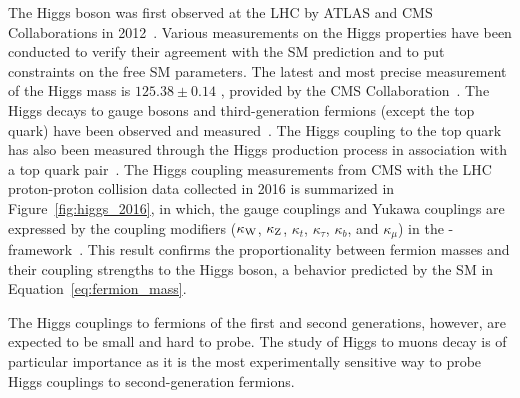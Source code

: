 The Higgs boson was first observed at the LHC by ATLAS and CMS Collaborations in 2012~\cite{Aad:2012tfa, Chatrchyan:2012xdj, Chatrchyan:2013lba}.
Various measurements on the Higgs properties have been conducted to verify their agreement with the SM prediction and to put constraints on the free SM parameters.
The latest and most precise measurement of the Higgs mass is $125.38 \pm 0.14$ \GeV, provided by the CMS Collaboration~\cite{2020135425}. 
The Higgs decays to gauge bosons and third-generation fermions (except the top quark) have been observed 
and measured~\cite{Sirunyan:2312121, 201996, Sirunyan:2017exp, PhysRevLett.121.121801, 2018283, PhysRevD.99.072001, 201859, 2019508, Aaboud_2018}.
The Higgs coupling to the top quark has also been measured through the Higgs production process in association with a top quark pair~\cite{PhysRevLett.120.231801, 2018173}.
The Higgs coupling measurements from CMS with the LHC proton-proton collision data collected in 2016 is summarized in Figure~\ref{fig:higgs_2016},
in which, the gauge couplings and Yukawa couplings are expressed by the coupling modifiers 
($\kappa_{\mathrm{W}}$, $\kappa_{\mathrm{Z}}$, $\kappa_{t}$, $\kappa_{\tau}$, $\kappa_{b}$, and $\kappa_{\mu}$) in the \kappa-framework~\cite{Heinemeyer:2013tqa}.
This result confirms the proportionality between fermion masses and their coupling strengths to the Higgs boson,
a behavior predicted by the SM in Equation~\ref{eq:fermion_mass}.

The Higgs couplings to fermions of the first and second generations, 
however, are expected to be small and hard to probe.
The study of Higgs to muons decay is of particular importance 
as it is the most experimentally sensitive way to probe Higgs couplings to second-generation fermions.
 



